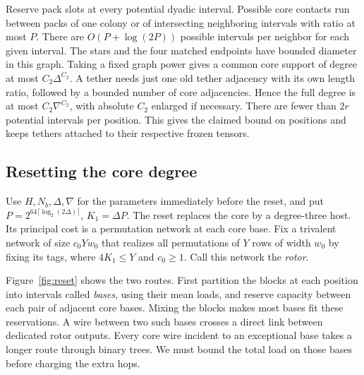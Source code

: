 Reserve pack slots at every potential dyadic interval. Possible core contacts run between packs of one colony or of intersecting neighboring intervals with ratio at most \(P\). There are \(O(P+\log(2P))\) possible intervals per neighbor for each given interval. The stars and the four matched endpoints have bounded diameter in this graph. Taking a fixed graph power gives a common core support of degree at most \(C_2\Delta^{C_2}\). A tether needs just one old tether adjacency with its own length ratio, followed by a bounded number of core adjacencies. Hence the full degree is at most \(C_2\nabla^{C_2}\), with absolute \(C_2\) enlarged if necessary. There are fewer than \(2r\) potential intervals per position. This gives the claimed bound on positions and keeps tethers attached to their respective frozen tensors.

\subsection{Resetting the core degree}\label{subsec:reset}
Use \(H,N_b,\Delta,\nabla\) for the parameters immediately before the
reset, and put \(P=2^{64\lceil\log_2(2\Delta)\rceil}\),
\(K_1=\Delta P\). The reset replaces the core by a degree-three host.
Its principal cost is a permutation network at each core base. Fix a
trivalent network of size \(c_0Yw_0\) that realizes all permutations
of \(Y\) rows of width \(w_0\) by fixing its tags, where \(4K_1\le Y\)
and \(c_0\ge1\). Call this network the \emph{rotor}.

Figure~\ref{fig:reset} shows the two routes. First partition the blocks
at each position into intervals called \emph{bases}, using their mean
loads, and reserve capacity between each pair of adjacent core bases.
Mixing the blocks makes most bases fit these reservations. A wire
between two such bases crosses a direct link between dedicated rotor
outputs. Every core wire incident to an exceptional base takes a longer
route through binary trees. We must bound the total load on those bases
before charging the extra hops.

